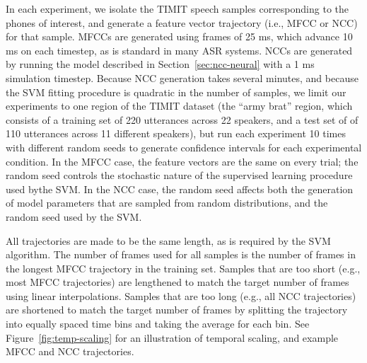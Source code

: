 In each experiment,
we isolate the TIMIT speech samples
corresponding to the phones
of interest,
and generate a feature vector trajectory
(i.e., MFCC or NCC)
for that sample.
MFCCs are generated using frames
of 25 ms,
which advance 10 ms on each timestep,
as is standard in many ASR systems.
NCCs are generated
by running the model described in
Section~\ref{sec:ncc-neural} with a 1 ms simulation timestep.
Because NCC generation takes several minutes,
and because the SVM fitting procedure
is quadratic in the number of samples,
we limit our experiments to
one region of the TIMIT dataset
(the ``army brat'' region,
which consists of a training set
of 220 utterances across 22 speakers,
and a test set of of 110 utterances
across 11 different speakers),
but run each experiment
10 times with different random seeds
to generate confidence intervals
for each experimental condition.
In the MFCC case,
the feature vectors are the same
on every trial;
the random seed controls the
stochastic nature of
the supervised learning procedure
used bythe SVM.
In the NCC case,
the random seed affects both
the generation of model parameters
that are sampled from random distributions,
and the random seed used by the SVM.

All trajectories are
made to be the same length,
as is required by the SVM algorithm.
The number of frames used
for all samples is
the number of frames in
the longest MFCC trajectory
in the training set.
Samples that are too short
(e.g., most MFCC trajectories)
are lengthened to match the
target number of frames
using linear interpolations.
Samples that are too long
(e.g., all NCC trajectories)
are shortened to match the
target number of frames
by splitting the trajectory
into equally spaced time bins
and taking the average
for each bin.
See Figure~\ref{fig:temp-scaling} for
an illustration of temporal scaling,
and example MFCC and NCC trajectories.


